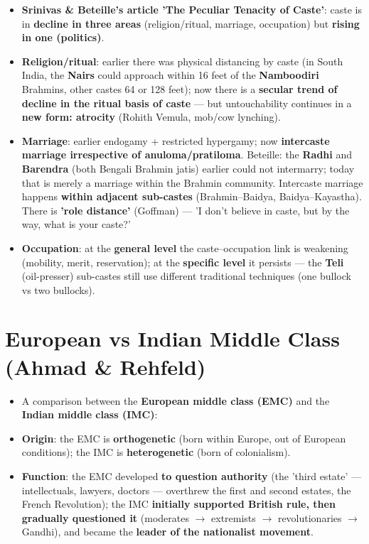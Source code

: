\begin{KeyConcept}
\begin{itemize}
\item \textbf{Srinivas \& Beteille's article 'The Peculiar Tenacity of Caste'}: caste is in \textbf{decline in three areas} (religion/ritual, marriage, occupation) but \textbf{rising in one (politics)}.
\item \textbf{Religion/ritual}: earlier there was physical distancing by caste (in South India, the \textbf{Nairs} could approach within 16 feet of the \textbf{Namboodiri} Brahmins, other castes 64 or 128 feet); now there is a \textbf{secular trend of decline in the ritual basis of caste} --- but untouchability continues in a \textbf{new form: atrocity} (Rohith Vemula, mob/cow lynching).
\item \textbf{Marriage}: earlier endogamy + restricted hypergamy; now \textbf{intercaste marriage irrespective of anuloma/pratiloma}. Beteille: the \textbf{Radhi} and \textbf{Barendra} (both Bengali Brahmin jatis) earlier could not intermarry; today that is merely a marriage within the Brahmin community. Intercaste marriage happens \textbf{within adjacent sub-castes} (Brahmin--Baidya, Baidya--Kayastha). There is \textbf{'role distance'} (Goffman) --- 'I don't believe in caste, but by the way, what is your caste?'
\item \textbf{Occupation}: at the \textbf{general level} the caste--occupation link is weakening (mobility, merit, reservation); at the \textbf{specific level} it persists --- the \textbf{Teli} (oil-presser) sub-castes still use different traditional techniques (one bullock vs two bullocks).
\end{itemize}
\end{KeyConcept}

\section{European vs Indian Middle Class (Ahmad \& Rehfeld)}

\begin{KeyConcept}
\begin{itemize}
\item A comparison between the \textbf{European middle class (EMC)} and the \textbf{Indian middle class (IMC)}:
\item \textbf{Origin}: the EMC is \textbf{orthogenetic} (born within Europe, out of European conditions); the IMC is \textbf{heterogenetic} (born of colonialism).
\item \textbf{Function}: the EMC developed \textbf{to question authority} (the 'third estate' --- intellectuals, lawyers, doctors --- overthrew the first and second estates, the French Revolution); the IMC \textbf{initially supported British rule, then gradually questioned it} (moderates $\rightarrow$ extremists $\rightarrow$ revolutionaries $\rightarrow$ Gandhi), and became the \textbf{leader of the nationalist movement}.
\end{itemize}
\end{KeyConcept}

